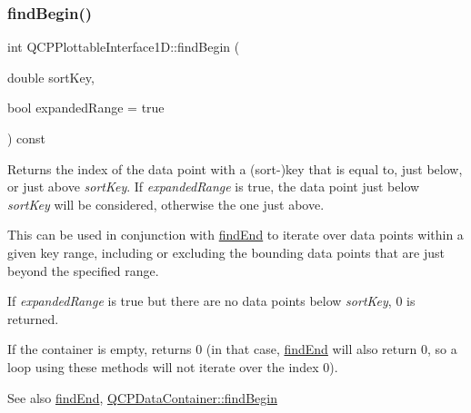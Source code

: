 \mbox{\label{class_q_c_p_plottable_interface1_d_a5b95783271306a4de97be54eac1e7d13}} 
\subsubsection{\texorpdfstring{find\+Begin()}{findBegin()}}
{\footnotesize\ttfamily int Q\+C\+P\+Plottable\+Interface1\+D\+::find\+Begin (\begin{DoxyParamCaption}\item[{double}]{sort\+Key,  }\item[{bool}]{expanded\+Range = {\ttfamily true} }\end{DoxyParamCaption}) const\hspace{0.3cm}{\ttfamily [pure virtual]}}

Returns the index of the data point with a (sort-\/)key that is equal to, just below, or just above {\itshape sort\+Key}. If {\itshape expanded\+Range} is true, the data point just below {\itshape sort\+Key} will be considered, otherwise the one just above.

This can be used in conjunction with \hyperlink{class_q_c_p_plottable_interface1_d_a5deced1016bc55a41a2339619045b295}{find\+End} to iterate over data points within a given key range, including or excluding the bounding data points that are just beyond the specified range.

If {\itshape expanded\+Range} is true but there are no data points below {\itshape sort\+Key}, 0 is returned.

If the container is empty, returns 0 (in that case, \hyperlink{class_q_c_p_plottable_interface1_d_a5deced1016bc55a41a2339619045b295}{find\+End} will also return 0, so a loop using these methods will not iterate over the index 0).

\begin{DoxySeeAlso}{See also}
\hyperlink{class_q_c_p_plottable_interface1_d_a5deced1016bc55a41a2339619045b295}{find\+End}, \hyperlink{class_q_c_p_data_container_a2ad8a5399072d99a242d3a6d2d7e278a}{Q\+C\+P\+Data\+Container\+::find\+Begin} 
\end{DoxySeeAlso}


